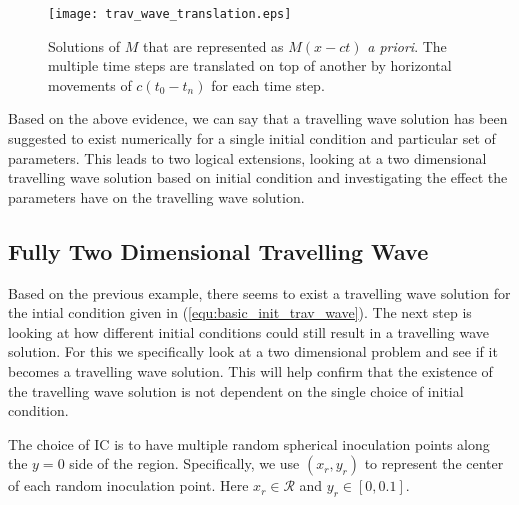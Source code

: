 \begin{figure}[!htp]
  \centering
    \texttt{[image: trav\_wave\_translation.eps]}
    \caption{Solutions of $M$ that are represented as $M(x -ct)$ \textit{a priori}.
      The multiple time steps are translated on top of another by horizontal movements of $c (t_0 - t_n)$ for each time step.
      }
    \label{fig:trav_wave_translation}
\end{figure}

Based on the above evidence, we can say that a travelling wave solution has been suggested to exist numerically for a single initial condition and particular set of parameters.
This leads to two logical extensions, looking at a two dimensional travelling wave solution based on initial condition and investigating the effect the parameters have on the travelling wave solution.

\subsection{Fully Two Dimensional Travelling Wave}


Based on the previous example, there seems to exist a travelling wave solution for the intial condition given in (\ref{equ:basic_init_trav_wave}).
The next step is looking at how different initial conditions could still result in a travelling wave solution.
For this we specifically look at a two dimensional problem and see if it becomes a travelling wave solution.
This will help confirm that the existence of the travelling wave solution is not dependent on the single choice of initial condition.

The choice of IC is to have multiple random spherical inoculation points along the $y=0$ side of the region.
Specifically, we use $(x_r, y_r)$ to represent the center of each random inoculation point.
Here $x_r \in \mathcal{R}$ and $y_r \in [0, 0.1]$.

